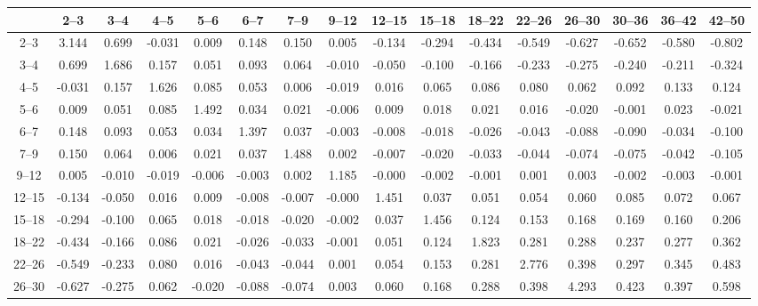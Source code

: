 \begin{table}[tb]
    {\renewcommand{\tabcolsep}{0.1cm} \begin{tabular}{c|ccccccccccccccc}
    \hline
           &   2--3 &   3--4 &   4--5 &   5--6 &   6--7 &   7--9 &  9--12 & 12--15 & 15--18 & 18--22 & 22--26 & 26--30 & 30--36 & 36--42 & 42--50 \\
    \hline
    2--3   &  3.144 &  0.699 & -0.031 &  0.009 &  0.148 &  0.150 &  0.005 & -0.134 & -0.294 & -0.434 & -0.549 & -0.627 & -0.652 & -0.580 & -0.802 \\
    3--4   &  0.699 &  1.686 &  0.157 &  0.051 &  0.093 &  0.064 & -0.010 & -0.050 & -0.100 & -0.166 & -0.233 & -0.275 & -0.240 & -0.211 & -0.324 \\
    4--5   & -0.031 &  0.157 &  1.626 &  0.085 &  0.053 &  0.006 & -0.019 &  0.016 &  0.065 &  0.086 &  0.080 &  0.062 &  0.092 &  0.133 &  0.124 \\
    5--6   &  0.009 &  0.051 &  0.085 &  1.492 &  0.034 &  0.021 & -0.006 &  0.009 &  0.018 &  0.021 &  0.016 & -0.020 & -0.001 &  0.023 & -0.021 \\
    6--7   &  0.148 &  0.093 &  0.053 &  0.034 &  1.397 &  0.037 & -0.003 & -0.008 & -0.018 & -0.026 & -0.043 & -0.088 & -0.090 & -0.034 & -0.100 \\
    7--9   &  0.150 &  0.064 &  0.006 &  0.021 &  0.037 &  1.488 &  0.002 & -0.007 & -0.020 & -0.033 & -0.044 & -0.074 & -0.075 & -0.042 & -0.105 \\
    9--12  &  0.005 & -0.010 & -0.019 & -0.006 & -0.003 &  0.002 &  1.185 & -0.000 & -0.002 & -0.001 &  0.001 &  0.003 & -0.002 & -0.003 & -0.001 \\
    12--15 & -0.134 & -0.050 &  0.016 &  0.009 & -0.008 & -0.007 & -0.000 &  1.451 &  0.037 &  0.051 &  0.054 &  0.060 &  0.085 &  0.072 &  0.067 \\
    15--18 & -0.294 & -0.100 &  0.065 &  0.018 & -0.018 & -0.020 & -0.002 &  0.037 &  1.456 &  0.124 &  0.153 &  0.168 &  0.169 &  0.160 &  0.206 \\
    18--22 & -0.434 & -0.166 &  0.086 &  0.021 & -0.026 & -0.033 & -0.001 &  0.051 &  0.124 &  1.823 &  0.281 &  0.288 &  0.237 &  0.277 &  0.362 \\
    22--26 & -0.549 & -0.233 &  0.080 &  0.016 & -0.043 & -0.044 &  0.001 &  0.054 &  0.153 &  0.281 &  2.776 &  0.398 &  0.297 &  0.345 &  0.483 \\
    26--30 & -0.627 & -0.275 &  0.062 & -0.020 & -0.088 & -0.074 &  0.003 &  0.060 &  0.168 &  0.288 &  0.398 &  4.293 &  0.423 &  0.397 &  0.598 \\

\end{tabular}}
\end{table}
